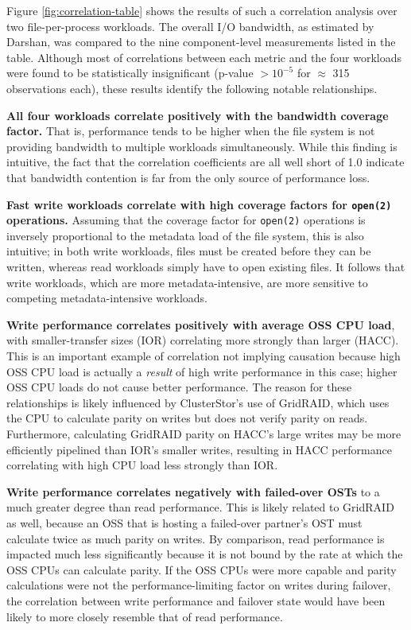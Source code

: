 Figure \ref{fig:correlation-table} shows the results of such a correlation analysis over two file-per-process workloads.
The overall I/O bandwidth, as estimated by Darshan, was compared to the nine component-level measurements listed in the table.
Although most of correlations between each metric and the four workloads were found to be statistically insignificant (p-value $> 10^{-5}$ for $\approx$ 315 observations each), these results identify the following notable relationships.

\textbf{All four workloads correlate positively with the bandwidth coverage factor.}  That is, performance tends to be higher when the file system is not providing bandwidth to multiple workloads simultaneously.
While this finding is intuitive, the fact that the correlation coefficients are all well short of 1.0 indicate that bandwidth contention is far from the only source of performance loss.

\textbf{Fast write workloads correlate with high coverage factors for \texttt{open(2)} operations.}  Assuming that the coverage factor for \texttt{open(2)} operations is inversely proportional to the metadata load of the file system, this is also intuitive; in both write workloads, files must be created before they can be written, whereas read workloads simply have to open existing files.
It follows that write workloads, which are more metadata-intensive, are more sensitive to competing metadata-intensive workloads.

\textbf{Write performance correlates positively with average OSS CPU load}, with smaller-transfer sizes (IOR) correlating more strongly than larger (HACC).
This is an important example of correlation not implying causation because high OSS CPU load is actually a \emph{result} of high write performance in this case; higher OSS CPU loads do not cause better performance.
The reason for these relationships is likely influenced by ClusterStor's use of GridRAID, which uses the CPU to calculate parity on writes but does not verify parity on reads.
Furthermore, calculating GridRAID parity on HACC's large writes may be more efficiently pipelined than IOR's smaller writes, resulting in HACC performance correlating with high CPU load less strongly than IOR.

\textbf{Write performance correlates negatively with failed-over OSTs} to a much greater degree than read performance.
This is likely related to GridRAID as well, because an OSS that is hosting a failed-over partner's OST must calculate twice as much parity on writes.
By comparison, read performance is impacted much less significantly because it is not bound by the rate at which the OSS CPUs can calculate parity.
If the OSS CPUs were more capable and parity calculations were not the performance-limiting factor on writes during failover, the correlation between write performance and failover state would have been likely to more closely resemble that of read performance.

